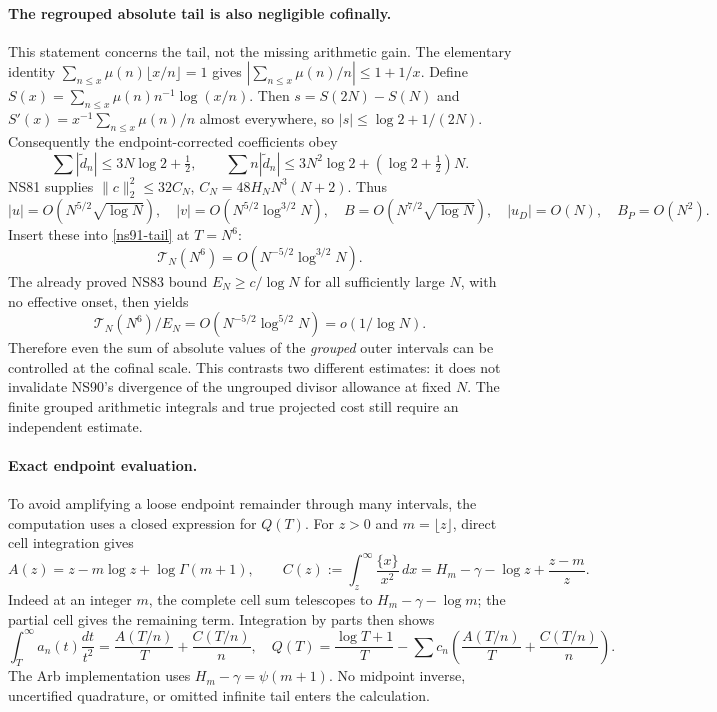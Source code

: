 \paragraph{The regrouped absolute tail is also negligible cofinally.}
This statement concerns the tail, not the missing arithmetic gain.
The elementary identity
$\sum_{n\le x}\mu(n)\lfloor x/n\rfloor=1$ gives
$|\sum_{n\le x}\mu(n)/n|\le1+1/x$.
Define $S(x)=\sum_{n\le x}\mu(n)n^{-1}\log(x/n)$. Then
$s=S(2N)-S(N)$ and $S'(x)=x^{-1}\sum_{n\le x}\mu(n)/n$ almost everywhere, so
$|s|\le\log2+1/(2N)$. Consequently the endpoint-corrected coefficients obey
\[
 \sum|\widetilde d_n|\le3N\log2+\tfrac12,\qquad
 \sum n|\widetilde d_n|\le3N^2\log2+(\log2+\tfrac12)N.
\]
NS81 supplies $\|c\|_2^2\le32C_N$,
$C_N=48H_NN^3(N+2)$. Thus
\[
 |u|=O(N^{5/2}\sqrt{\log N}),\quad
 |v|=O(N^{5/2}\log^{3/2}N),\quad
 B=O(N^{7/2}\sqrt{\log N}),\quad
 |u_D|=O(N),\quad B_P=O(N^2).
\]
Insert these into \eqref{ns91-tail} at $T=N^6$:
\[
 \mathcal T_N(N^6)=O(N^{-5/2}\log^{3/2}N).
\]
The already proved NS83 bound $E_N\ge c/\log N$ for all sufficiently
large $N$, with no effective onset, then yields
\[
 \mathcal T_N(N^6)/E_N=O(N^{-5/2}\log^{5/2}N)=o(1/\log N).
\]
Therefore even the sum of absolute values of the \emph{grouped} outer
intervals can be controlled at the cofinal scale. This contrasts two
different estimates: it does not invalidate NS90's divergence of the
ungrouped divisor allowance at fixed $N$. The finite grouped arithmetic
integrals and true projected cost still require an independent estimate.

\paragraph{Exact endpoint evaluation.}
To avoid amplifying a loose endpoint remainder through many intervals,
the computation uses a closed expression for $Q(T)$. For $z>0$ and
$m=\lfloor z\rfloor$, direct cell integration gives
\[
 A(z)=z-m\log z+\log\Gamma(m+1),\qquad
 C(z):=\int_z^\infty\frac{\{x\}}{x^2}\,dx
 =H_m-\gamma-\log z+\frac{z-m}{z}.
\]
Indeed at an integer $m$, the complete cell sum telescopes to
$H_m-\gamma-\log m$; the partial cell gives the remaining term.
Integration by parts then shows
\[
 \int_T^\infty a_n(t)\frac{dt}{t^2}=\frac{A(T/n)}T+\frac{C(T/n)}n,
\quad Q(T)=\frac{\log T+1}T-
 \sum c_n\left(\frac{A(T/n)}T+\frac{C(T/n)}n\right).
\]
The Arb implementation uses $H_m-\gamma=\psi(m+1)$. No midpoint inverse,
uncertified quadrature, or omitted infinite tail enters the calculation.

